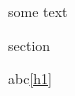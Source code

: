 \documentclass[english]{article}
\begin{document}
some text

\tagpdfparaOff
{}\label{h1} section\tagmcend\tagstructend

\tagpdfparaOn

abc\ref{h1}
\end{document}
